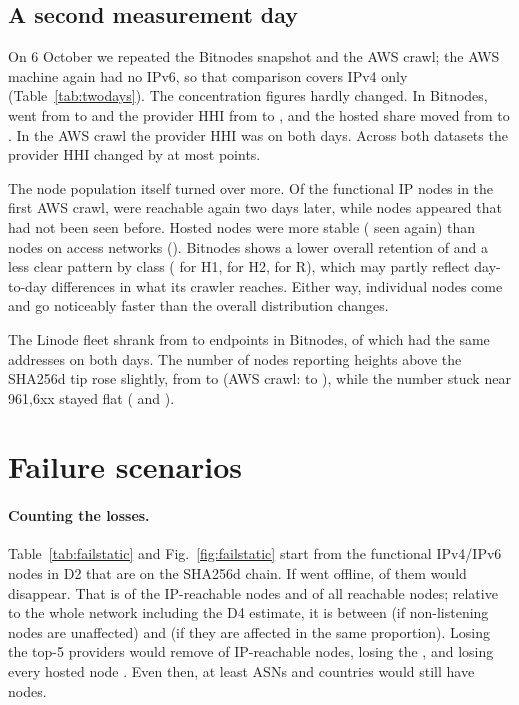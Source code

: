 \documentclass[10pt,a4paper]{article}
\begin{document}
\subsection{A second measurement day}\label{sec:twodays}

On 6 October we repeated the Bitnodes snapshot and the AWS crawl; the AWS machine again had no IPv6, so that comparison covers IPv4 only (Table~\ref{tab:twodays}). The concentration figures hardly changed. In Bitnodes, \TdDtwoBTopLabel{} went from \TdDtwoATop{} to \TdDtwoBTop{} and the provider HHI from \TdDtwoAProvHHI{} to \TdDtwoBProvHHI{}, and the hosted share moved from \TdDtwoAHosted{} to \TdDtwoBHosted{}. In the AWS crawl the provider HHI was \TdAwsAProvHHI{} on both days. Across both datasets the provider HHI changed by at most \TdMaxProvHHIChange{} points.

The node population itself turned over more. Of the functional IP nodes in the first AWS crawl, \TdAwsRetained{} were reachable again two days later, while \TdAwsOnlyB{} nodes appeared that had not been seen before. Hosted nodes were more stable (\TdAwsRetHosted{} seen again) than nodes on access networks (\TdAwsRetR). Bitnodes shows a lower overall retention of \TdDtwoRetained{} and a less clear pattern by class (\TdDtwoRetHOne{} for H1, \TdDtwoRetHTwo{} for H2, \TdDtwoRetR{} for R), which may partly reflect day-to-day differences in what its crawler reaches. Either way, individual nodes come and go noticeably faster than the overall distribution changes.

The Linode fleet shrank from \TdDtwoAFleet{} to \TdDtwoBFleet{} endpoints in Bitnodes, \TdFleetBoth{} of which had the same addresses on both days. The number of nodes reporting heights above the SHA256d tip rose slightly, from \TdDtwoAAbove{} to \TdDtwoBAbove{} (AWS crawl: \TdAwsAAbove{} to \TdAwsBAbove), while the number stuck near 961{,}6xx stayed flat (\TdDtwoAStalled{} and \TdDtwoBStalled).



\section{Failure scenarios}\label{sec:failure}

\paragraph{Counting the losses.} Table~\ref{tab:failstatic} and Fig.~\ref{fig:failstatic} start from the \FailIP{} functional IPv4/IPv6 nodes in D2 that are on the SHA256d chain. If \ProvOneName{} went offline, \FailProvLost{} of them would disappear. That is \FailProvIP{} of the IP-reachable nodes and \FailProvAll{} of all reachable nodes; relative to the whole network including the D4 estimate, it is between \FailProvA{} (if non-listening nodes are unaffected) and \FailProvB{} (if they are affected in the same proportion). Losing the top-5 providers would remove \FailTopfiveIP{} of IP-reachable nodes, losing the \CcOneName{} \FailCcIP{}, and losing every hosted node \FailHostedIP{}. Even then, at least \FailMinAsns{} ASNs and \FailMinCcs{} countries would still have nodes.
\end{document}
